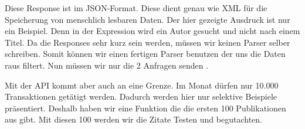 Diese Response ist im JSON-Format. Diese dient genau wie XML für die Speicherung von menschlich lesbaren Daten. Der hier gezeigte Ausdruck ist nur ein Beispiel. Denn in der Expression wird ein Autor gesucht und nicht nach einem Titel. Da die Responses sehr kurz sein werden, müssen wir keinen Parser selber schreiben. Somit können wir einen fertigen Parser benutzen der uns die Daten raus filtert. Nun müssen wir nur die 2 Anfragen senden .

Mit der API kommt aber auch an eine Grenze. Im Monat dürfen nur 10.000 Transaktionen getätigt werden. Dadurch werden hier nur selektive Beispiele präsentiert. Deshalb haben wir eine Funktion die die ersten 100 Publikationen aus gibt. Mit diesen 100 werden wir die Zitate Testen und begutachten.
